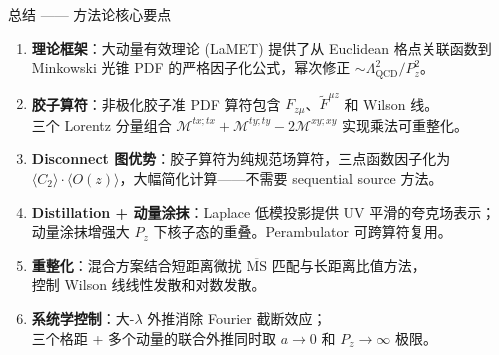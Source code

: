 \documentclass[10pt,aspectratio=169]{beamer}
\newcommand{\msbar}{\overline{\mathrm{MS}}}
\newcommand{\lqcd}{\Lambda_{\mathrm{QCD}}}
\newcommand{\Pz}{P_z}
\begin{document}
\begin{frame}{总结 —— 方法论核心要点}
\small
\begin{enumerate}
  \item \textbf{理论框架}：大动量有效理论 (LaMET) 提供了从 Euclidean 格点关联函数到\\
  Minkowski 光锥 PDF 的严格因子化公式，幂次修正 $\sim \lqcd^2/\Pz^2$。

  \item \textbf{胶子算符}：非极化胶子准 PDF 算符包含 $F_{z\mu}$、$\tilde{F}^{\mu z}$ 和 Wilson 线。\\
  三个 Lorentz 分量组合 $\mathcal{M}^{tx;tx}+\mathcal{M}^{ty;ty}-2\mathcal{M}^{xy;xy}$ 实现乘法可重整化。

  \item \textbf{Disconnect 图优势}：胶子算符为纯规范场算符，三点函数因子化为\\
  $\langle C_2 \rangle \cdot \langle O(z) \rangle$，大幅简化计算——不需要 sequential source 方法。

  \item \textbf{Distillation + 动量涂抹}：Laplace 低模投影提供 UV 平滑的夸克场表示；\\
  动量涂抹增强大 $\Pz$ 下核子态的重叠。Perambulator 可跨算符复用。

  \item \textbf{重整化}：混合方案结合短距离微扰 $\msbar$ 匹配与长距离比值方法，\\
  控制 Wilson 线线性发散和对数发散。

  \item \textbf{系统学控制}：大-$\lambda$ 外推消除 Fourier 截断效应；\\
  三个格距 + 多个动量的联合外推同时取 $a \to 0$ 和 $\Pz \to \infty$ 极限。
\end{enumerate}
\end{frame}
\end{document}
